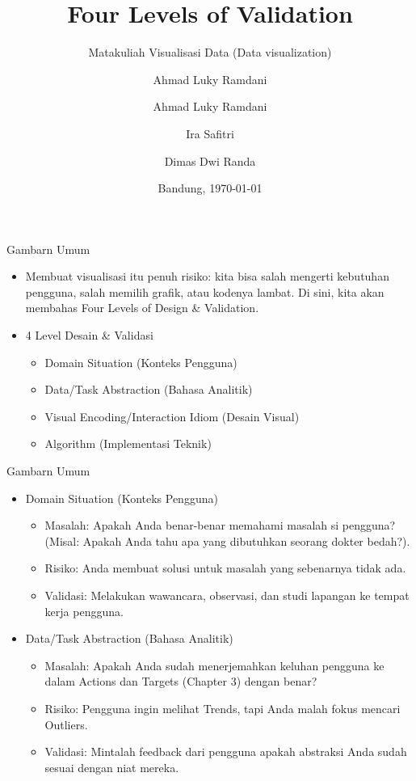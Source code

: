 \documentclass[t]{beamer}
\title[Visualisasi Data - Pertemuan 4]{Four Levels of Validation}
\author{Ahmad Luky Ramdani}
\subtitle{Matakuliah Visualisasi Data (Data visualization)}
\author[Ahmad Luky Ramdani]{Ahmad Luky Ramdani \and Ira Safitri \and Dimas Dwi Randa}
\institute[ITERA]
{
  Program Studi Data Sains\\
  Fakultas Sains \\
  Institut Teknologi Sumatera
}
\date{Bandung, \today}
\begin{document}
\frame{\titlepage}


\begin{frame}{Gambarn Umum}
	\begin{itemize}
	\item Membuat visualisasi itu penuh risiko: kita bisa salah mengerti kebutuhan pengguna, salah memilih grafik, atau kodenya lambat. Di sini, kita akan membahas Four Levels of Design \& Validation. \\
	
	\item 4 Level Desain \& Validasi

	\begin{itemize}
		\item Domain Situation (Konteks Pengguna)
		\item Data/Task Abstraction (Bahasa Analitik)
		\item Visual Encoding/Interaction Idiom (Desain Visual)
		\item Algorithm (Implementasi Teknik)
	\end{itemize}
	\end{itemize}
\end{frame}


\begin{frame}{Gambarn Umum}		
	\begin{itemize}
	\item Domain Situation (Konteks Pengguna)		
	\begin{itemize}
		\item Masalah: Apakah Anda benar-benar memahami masalah si pengguna? (Misal: Apakah Anda tahu apa yang dibutuhkan seorang dokter bedah?).
		\item Risiko: Anda membuat solusi untuk masalah yang sebenarnya tidak ada.
		\item Validasi: Melakukan wawancara, observasi, dan studi lapangan ke tempat kerja pengguna.
	\end{itemize}
	\item Data/Task Abstraction (Bahasa Analitik)
		\begin{itemize}
			\item Masalah: Apakah Anda sudah menerjemahkan keluhan pengguna ke dalam Actions dan Targets (Chapter 3) dengan benar?
			\item Risiko: Pengguna ingin melihat Trends, tapi Anda malah fokus mencari Outliers.
			\item Validasi: Mintalah feedback dari pengguna apakah abstraksi Anda sudah sesuai dengan niat mereka.
		\end{itemize}
	\end{itemize}
\end{frame}
\end{document}
